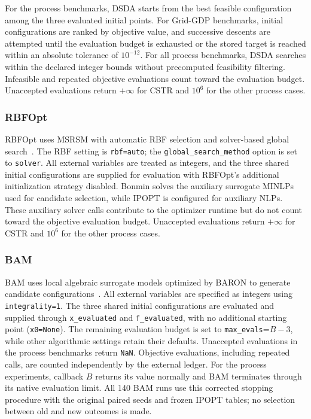 \documentclass{article}
\begin{document}
For the process benchmarks, DSDA starts from the best feasible configuration among the three evaluated initial points.
For Grid-GDP benchmarks, initial configurations are ranked by objective value, and successive descents are attempted until the evaluation budget is exhausted or the stored target is reached within an absolute tolerance of $10^{-12}$.
For all process benchmarks, DSDA searches within the declared integer bounds without precomputed feasibility filtering.
Infeasible and repeated objective evaluations count toward the evaluation budget.
Unaccepted evaluations return $+\infty$ for CSTR and $10^6$ for the other process cases.

\subsubsection{RBFOpt}
RBFOpt uses MSRSM with automatic RBF selection and solver-based global search~\cite{costa2018rbfopt,nannicini2021implementation}. 
The RBF setting is \texttt{rbf=auto}; the \texttt{global\_search\_method} option is set to \texttt{solver}.
All external variables are treated as integers, and the three shared initial configurations are supplied for evaluation with RBFOpt's additional initialization strategy disabled.
Bonmin solves the auxiliary surrogate MINLPs used for candidate selection, while IPOPT is configured for auxiliary NLPs.
These auxiliary solver calls contribute to the optimizer runtime but do not count toward the objective evaluation budget.
Unaccepted evaluations return $+\infty$ for CSTR and $10^6$ for the other process cases.

\subsubsection{BAM}
BAM uses local algebraic surrogate models optimized by BARON to generate candidate configurations~\cite{ma2023bam,bamManual}.
All external variables are specified as integers using \texttt{integrality=1}.
The three shared initial configurations are evaluated and supplied through \texttt{x\_evaluated} and \texttt{f\_evaluated}, with no additional starting point (\texttt{x0=None}).
The remaining evaluation budget is set to \texttt{max\_evals}=$B-3$, while other algorithmic settings retain their defaults.
Unaccepted evaluations in the process benchmarks return \texttt{NaN}.
Objective evaluations, including repeated calls, are counted independently by the external ledger. For the process experiments, callback $B$ returns its value normally and BAM terminates through its native evaluation limit. All 140 BAM runs use this corrected stopping procedure with the original paired seeds and frozen IPOPT tables; no selection between old and new outcomes is made.
\end{document}
